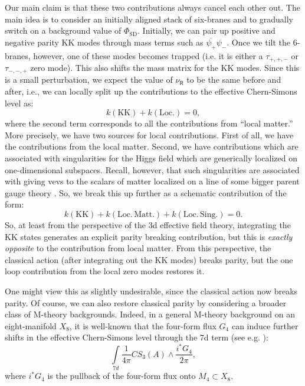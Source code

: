\documentclass[12pt]{article}%
\numberwithin{equation}{section}
\renewcommand{\(}{\left(}
\renewcommand{\)}{\right)}
\renewcommand{\[}{\left[}
\renewcommand{\]}{\right]}
\begin{document}
Our main claim is that these two contributions always cancel each other out. The main idea is to consider an initially
aligned stack of six-branes and to gradually switch on a background value of $\Phi_{\mathrm{SD}}$. Initially,
we can pair up positive and negative parity KK modes through mass terms such as $\overline{\psi_{+}} \psi_{-}$.
Once we tilt the 6-branes, however, one of these modes becomes trapped (i.e. it is either a $\tau_{+,+,-}$ or $\tau_{-,-,+}$ zero mode). This also shifts the mass matrix for the KK modes. Since this is a small perturbation, we expect the value of $\nu_{\mathsf{R}}$ to be the same before and after, i.e., we can locally split up the contributions to the effective Chern-Simons level as:
\begin{equation}\label{eqn:KKLoc}
k(\mathrm{KK}) + k(\mathrm{Loc.})  = 0,
\end{equation}
where the second term corresponds to all the contributions from ``local matter.''
More precisely, we have two sources for local contributions. First of all,
we have the contributions from the local matter.
Second, we have contributions which are associated with singularities
for the Higgs field which are generically localized on one-dimensional subspaces.
Recall, however, that such singularities are associated with giving vevs to the
scalars of matter localized on a line of some bigger parent gauge theory \cite{Heckman:2018mxl, Beasley:2008dc}.
So, we break this up further as a schematic contribution of the form:
\begin{equation}
k(\mathrm{KK}) + k(\mathrm{Loc. \, Matt.}) +  k(\mathrm{Loc. \, Sing.}) = 0.
\end{equation}
So, at least from the perspective of the 3d effective field theory,
integrating the KK states generates an explicit parity breaking contribution,
but this is \textit{exactly opposite} to the contribution from local matter.
From this perspective, the classical action (after integrating out the KK modes)
breaks parity, but the one loop contribution from the local zero modes restores it.

One might view this as slightly undesirable, since the classical action now breaks parity.
Of course, we can also restore classical parity by considering a broader class of M-theory backgrounds.
Indeed, in a general M-theory background on an eight-manifold $X_8$,
it is well-known that the four-form flux $G_4$
can induce further shifts in the effective Chern-Simons level through the
7d term (see e.g. \cite{Gukov:1999ya, Gukov:2001hf}):
\begin{equation}
\underset{7d}{\int} \frac{1}{4 \pi} CS_{3}(A) \wedge \frac{i^{\ast}G_4}{2 \pi},
\end{equation}
where $i^{\ast} G_4$ is the pullback of the four-form flux onto $M_4 \subset X_8$.
\end{document}

